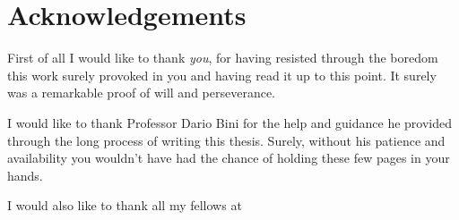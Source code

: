 \chapter{Acknowledgements}
First of all I would like to thank \emph{you}, for having resisted through the boredom this work surely provoked in you and having read it up to this point. It surely was a remarkable proof of will and perseverance.

I would like to thank Professor Dario Bini for the help and guidance he provided through the long process of writing this thesis. Surely, without his patience and availability you wouldn't have had the chance of holding these few pages in your hands.

I would also like to thank all my fellows at 